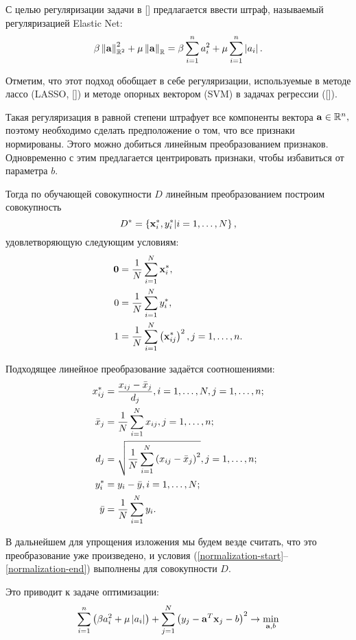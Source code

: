 С целью регуляризации задачи в [] предлагается ввести штраф, называемый регуляризацией Elastic Net:
\begin{equation*}
	\beta \left\|{\boldsymbol{\mathbf{a}}}\right\|_{\mathbb R^2}^2 + \mu \left\|{\boldsymbol{\mathbf{a}}}\right\|_{\mathbb R} 
	= \beta \sum\limits_{i=1}^n a_i^2 + \mu \sum\limits_{i=1}^n \left|a_i\right|.
\end{equation*}

Отметим, что этот подход обобщает в себе регуляризации, используемые в методе лассо (LASSO, []) и методе опорных вектором (SVM) в задачах регрессии ([]).

Такая регуляризация в равной степени штрафует все компоненты вектора $\boldsymbol{\mathbf{a}}\in \mathbb R^n,$ поэтому необходимо сделать предположение о том, что все признаки нормированы. 
Этого можно добиться линейным преобразованием признаков. 
Одновременно с этим предлагается центрировать признаки, чтобы избавиться от параметра $b$.

Тогда по обучающей совокупности $D$ линейным преобразованием построим совокупность
\begin{equation*}
	D^* = \left\{\boldsymbol{\mathbf{x}}^*_i, y^*_i | i = 1, \ldots, N\right\}, 
\end{equation*}
удовлетворяющую следующим условиям:
\begin{align}
	\label{normalization-start}
	\boldsymbol{\mathbf{0}} 	&= \frac1N\sum\limits_{i=1}^N\boldsymbol{\mathbf{x}}^*_i, \\
	0 		&= \frac1N\sum\limits_{i=1}^N y^*_i, \\
	\label{normalization-end}
	1 		&= \frac1N\sum\limits_{i=1}^N\left(\boldsymbol{\mathbf{x}}^*_{ij}\right)^2, j=1,\ldots, n.
\end{align}

\newcommand\oi[2]{#1=1, \ldots, #2}
Подходящее линейное преобразование задаётся соотношениями:
\begin{align*}
	x^*_{ij} 	&= \frac{x_{ij} - \bar x_j}{d_j}, \oi iN, \oi jn;\\
	\bar x_j 	&= \frac1N\suml_{i=1}^N x_{ij}, \oi jn;\\
	d_j 		&= \sqrt{\frac1N\suml_{i=1}^N \cbr{x_{ij}-\bar x_j}^2}, \oi jn;\\
	y^*_i 		&= y_i - \bar y, \oi iN;\\
	\bar y 		&= \frac1N\suml_{i=1}^N y_i. \\
\end{align*}

В дальнейшем для упрощения изложения мы будем везде считать, что это преобразование уже произведено, и условия (\ref{normalization-start}--\ref{normalization-end}) выполнены для совокупности $D.$

Это приводит к задаче оптимизации: 
\begin{equation}
	\label{basicEN}
	\sum_{i=1}^n\left(\beta a_i^2 + \mu \left|a_i\right|\right) 
	+ \sum_{j=1}^N\left(y_j - \boldsymbol{\mathbf{a}}^T \boldsymbol{\mathbf{x}}_j - b\right)^2 
	\to \mathop{\mbox{min}}\limits_{\boldsymbol{\mathbf{a}}, b}
\end{equation}
